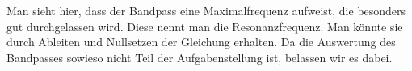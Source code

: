 \documentclass[a4paper,german,12pt,smallheadings]{scrartcl}
\begin{document}
Man sieht hier, dass der Bandpass eine Maximalfrequenz aufweist, die besonders
gut durchgelassen wird. Diese nennt man die Resonanzfrequenz. Man könnte sie
durch Ableiten und Nullsetzen der Gleichung erhalten. Da die Auswertung des
Bandpasses sowieso nicht Teil der Aufgabenstellung ist, belassen wir es dabei.
\end{document}
